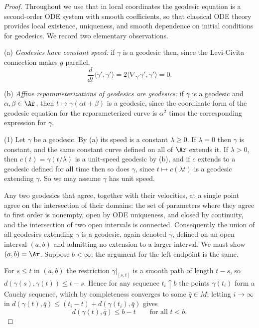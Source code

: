 \begin{proof}
Throughout we use that in local coordinates the geodesic equation
is a second-order ODE system with smooth coefficients, so that
classical ODE theory provides local existence, uniqueness, and
smooth dependence on initial conditions for geodesics. We record
two elementary observations.

(a) \emph{Geodesics have constant speed:} if $\gamma$ is a
geodesic then, since the Levi-Civita connection makes $g$
parallel,
$$\frac{d}{dt}\langle \gamma',\gamma'\rangle
=2\langle \nabla_{\gamma'}\gamma',\gamma'\rangle=0.$$

(b) \emph{Affine reparameterizations of geodesics are geodesics:}
if $\gamma$ is a geodesic and $\alpha,\beta\in\Ar$, then
$t\mapsto\gamma(\alpha t+\beta)$ is a geodesic, since the
coordinate form of the geodesic equation for the reparameterized
curve is $\alpha^2$ times the corresponding expression for
$\gamma$.

(1) Let $\gamma$ be a geodesic. By (a) its speed is a constant
$\lambda\ge0$. If $\lambda=0$ then $\gamma$ is constant, and the
same constant curve defined on all of $\Ar$ extends it. If
$\lambda>0$, then $c(t)=\gamma(t/\lambda)$ is a unit-speed
geodesic by (b), and if $c$ extends to a geodesic defined for all
time then so does $\gamma$, since $t\mapsto c(\lambda t)$ is a
geodesic extending $\gamma$. So we may assume $\gamma$ has unit
speed.

Any two geodesics that agree, together with their velocities, at
a single point agree on the intersection of their domains: the
set of parameters where they agree to first order is nonempty,
open by ODE uniqueness, and closed by continuity, and the
intersection of two open intervals is connected. Consequently the
union of all geodesics extending $\gamma$ is a geodesic, again
denoted $\gamma$, defined on an open interval $(a,b)$ and
admitting no extension to a larger interval. We must show
$(a,b)=\Ar$. Suppose $b<\infty$; the argument for the left
endpoint is the same.

For $s\le t$ in $(a,b)$ the restriction $\gamma|_{[s,t]}$ is a
smooth path of length $t-s$, so $d(\gamma(s),\gamma(t))\le t-s$.
Hence for any sequence $t_i\uparrow b$ the points $\gamma(t_i)$
form a Cauchy sequence, which by completeness converges to some
$\bar q\in M$; letting $i\rightarrow\infty$ in
$d(\gamma(t),\bar q)\le(t_i-t)+d(\gamma(t_i),\bar q)$ gives
$$d(\gamma(t),\bar q)\le b-t\qquad\text{for all } t<b.$$


\end{proof}
